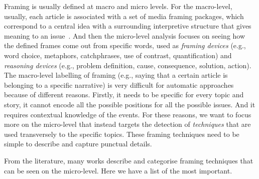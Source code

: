 
Framing is usually defined at macro and micro levels.
For the macro-level, usually, each article is associated with a set of media framing packages, which correspond to a central idea with a surrounding interpretive structure that gives meaning to an issue~\cite{gamson1989media}.
And then the micro-level analysis focuses on seeing how the defined frames come out from specific words, used as \textit{framing devices} (e.g., word choice, metaphors, catchphrases, use of contrast, quantification) and \textit{reasoning devices} (e.g., problem definition, cause, consequence, solution, action).
The macro-level labelling of framing (e.g., saying that a certain article is belonging to a specific narrative) is very difficult for automatic approaches because of different reasons. Firstly, it needs to be specific for every topic and story, it cannot encode all the possible positions for all the possible issues. And it requires contextual knowledge of the events.
For these reasons, we want to focus more on the micro-level that instead targets the detection of \emph{techniques} that are used transversely to the specific topics. These framing techniques need to be simple to describe and capture punctual details.

From the literature, many works describe and categorise framing techniques that can be seen on the micro-level. Here we have a list of the most important.

